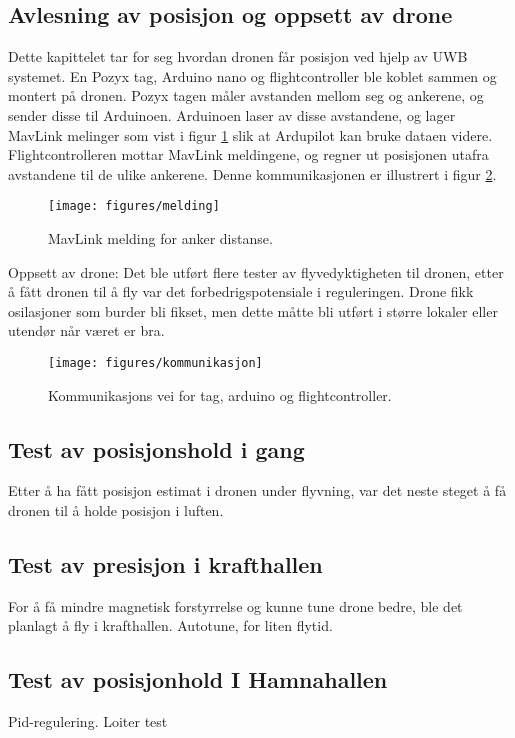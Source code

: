 \subsection{Avlesning av posisjon og oppsett av drone}
Dette kapittelet tar for seg hvordan dronen får posisjon ved hjelp av UWB systemet.
En Pozyx tag, Arduino nano og flightcontroller ble koblet sammen og montert på dronen. 
Pozyx tagen måler avstanden mellom seg og ankerene, og sender disse til Arduinoen. Arduinoen laser av disse avstandene, 
og lager MavLink melinger som vist i figur \ref{fig:melding} slik at Ardupilot kan bruke dataen videre. 
Flightcontrolleren mottar MavLink meldingene, og regner ut posisjonen utafra avstandene til de ulike ankerene. 
Denne kommunikasjonen er illustrert i figur \ref{fig:kommunikasjon}.

\begin{figure}[htp]
\centering
\texttt{[image: figures/melding]}
\caption{MavLink melding for anker distanse.}
\label{fig:melding}
\end{figure}

Oppsett av drone:
Det ble utført flere tester av flyvedyktigheten til dronen, etter å fått dronen til å fly var det forbedrigspotensiale i reguleringen. 
Drone fikk osilasjoner som burder bli fikset, men dette måtte bli utført i større lokaler eller utendør når været er bra. 

\begin{figure}[htp]
\centering
\texttt{[image: figures/kommunikasjon]}
\caption{Kommunikasjons vei for tag, arduino og flightcontroller.}
\label{fig:kommunikasjon}
\end{figure}

\subsection{Test av posisjonshold i gang}
Etter å ha fått posisjon estimat i dronen under flyvning, var det neste steget å få dronen til å holde posisjon i luften. 

\subsection{Test av presisjon i krafthallen}
For å få mindre magnetisk forstyrrelse og kunne tune drone bedre, ble det planlagt å fly i krafthallen. 
Autotune, for liten flytid. 

\subsection{Test av posisjonhold I Hamnahallen}
Pid-regulering. 
Loiter test

